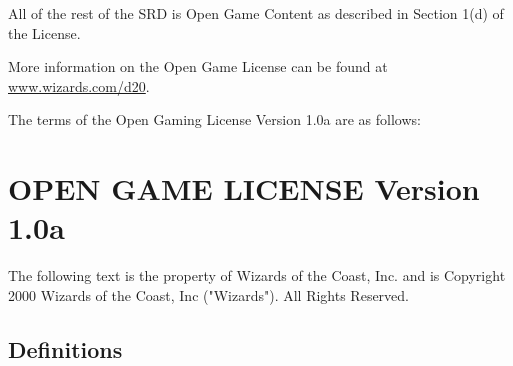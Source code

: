 All of the rest of the SRD is Open Game Content as described in Section 1(d) of the License. 


More information on the Open Game License can be found at \href{https://www.wizards.com/d20}{www.wizards.com/d20}.


The terms of the Open Gaming License Version 1.0a are as follows:


\section{OPEN GAME LICENSE Version 1.0a }


The following text is the property of Wizards of the Coast, Inc. and is Copyright 2000 Wizards of the Coast, Inc ("Wizards"). All Rights Reserved. 


\subsection{Definitions}

